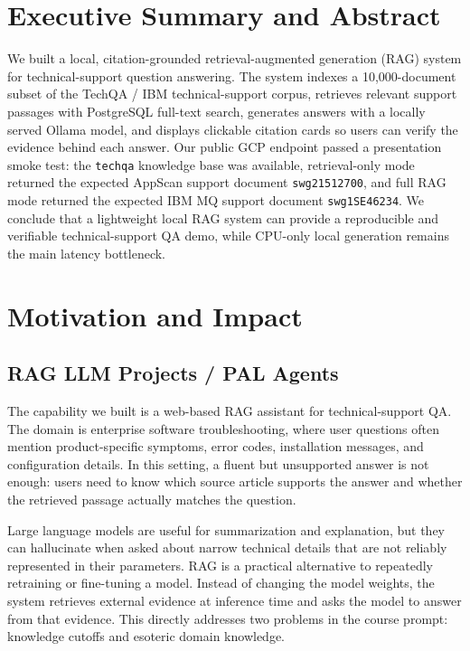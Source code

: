 \documentclass[paper=a4, fontsize=11pt]{scrartcl}
\title{\assignment}
\date{\duedate}
\author{
    \textbf{Yifan Tao and Letong Yi} \\
    \href{https://github.com/Jason-Tao22/ai-rag-knowledge}{https://github.com/Jason-Tao22/ai-rag-knowledge} \\
    Public endpoint: \href{http://35.247.103.164/}{http://35.247.103.164/}
}
\begin{document}
\maketitle

\section{Executive Summary and Abstract}

We built a local, citation-grounded retrieval-augmented generation (RAG) system for technical-support question answering. The system indexes a 10,000-document subset of the TechQA / IBM technical-support corpus, retrieves relevant support passages with PostgreSQL full-text search, generates answers with a locally served Ollama model, and displays clickable citation cards so users can verify the evidence behind each answer. Our public GCP endpoint passed a presentation smoke test: the \texttt{techqa} knowledge base was available, retrieval-only mode returned the expected AppScan support document \texttt{swg21512700}, and full RAG mode returned the expected IBM MQ support document \texttt{swg1SE46234}. We conclude that a lightweight local RAG system can provide a reproducible and verifiable technical-support QA demo, while CPU-only local generation remains the main latency bottleneck.

\section{Motivation and Impact}

\subsection{RAG LLM Projects / PAL Agents}

The capability we built is a web-based RAG assistant for technical-support QA. The domain is enterprise software troubleshooting, where user questions often mention product-specific symptoms, error codes, installation messages, and configuration details. In this setting, a fluent but unsupported answer is not enough: users need to know which source article supports the answer and whether the retrieved passage actually matches the question.

Large language models are useful for summarization and explanation, but they can hallucinate when asked about narrow technical details that are not reliably represented in their parameters. RAG is a practical alternative to repeatedly retraining or fine-tuning a model. Instead of changing the model weights, the system retrieves external evidence at inference time and asks the model to answer from that evidence. This directly addresses two problems in the course prompt: knowledge cutoffs and esoteric domain knowledge.
\end{document}
